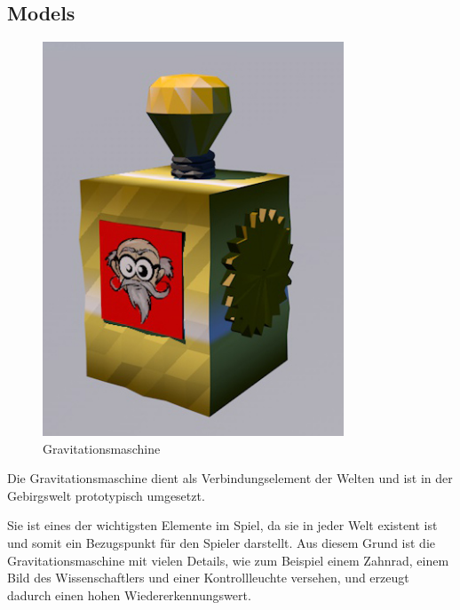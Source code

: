 \subsection{Models}


\begin{figure}[!htbp]%
	\centering
		\includegraphics[width=0.8\textwidth]{images/gravinator}
	\caption{Gravitationsmaschine}
	\label{fig:gravinator}
\end{figure}

Die Gravitationsmaschine dient als Verbindungselement der Welten und ist in der Gebirgswelt prototypisch umgesetzt.

Sie ist eines der wichtigsten Elemente im Spiel, da sie in jeder Welt existent ist und somit ein Bezugspunkt für den Spieler darstellt. Aus diesem Grund ist die Gravitationsmaschine mit vielen Details, wie zum Beispiel einem Zahnrad, einem Bild des Wissenschaftlers und einer Kontrollleuchte versehen, und  erzeugt dadurch einen hohen Wiedererkennungswert. 


